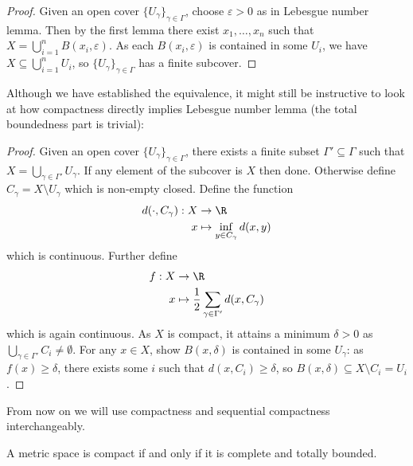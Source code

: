 \documentclass[a4paper]{article}
\begin{document}
\begin{proof}
  Given an open cover \(\{U_\gamma\}_{\gamma \in \Gamma}\), choose \(\varepsilon > 0\) as in Lebesgue number lemma. Then by the first lemma there exist \(x_1, \dots, x_n\) such that \(X = \bigcup_{i = 1}^n B(x_i, \varepsilon)\). As each \(B(x_i, \varepsilon)\) is contained in some \(U_i\), we have \(X \subseteq \bigcup_{i = 1}^n U_i\), so \(\{U_\gamma\}_{\gamma \in \Gamma}\) has a finite subcover.
\end{proof}

Although we have established the equivalence, it might still be instructive to look at how compactness directly implies Lebesgue number lemma (the total boundedness part is trivial):

\begin{proof}
  Given an open cover \(\{U_\gamma\}_{\gamma \in \Gamma}\), there exists a finite subset \(\Gamma' \subseteq \Gamma\) such that \(X = \bigcup_{\gamma \in \Gamma'} U_\gamma\). If any element of the subcover is \(X\) then done. Otherwise define \(C_\gamma = X \setminus U_\gamma\) which is non-empty closed. Define the function
  \begin{align*}
    d(\cdot, C_\gamma): X &\to \R \\
    x &\mapsto \inf_{y \in C_\gamma} d(x, y)
  \end{align*}
  which is continuous. Further define
  \begin{align*}
    f: X &\to \R \\
    x &\mapsto \frac{1}{2} \sum_{\gamma \in \Gamma'} d(x, C_\gamma)
  \end{align*}
  which is again continuous. As \(X\) is compact, it attains a minimum \(\delta > 0\) as \(\bigcup_{\gamma \in \Gamma'} C_i \neq \emptyset\). For any \(x \in X\), show \(B(x, \delta)\) is contained in some \(U_\gamma\): as \(f(x) \geq \delta\), there exists some \(i\) such that \(d(x, C_i) \geq \delta\), so \(B(x, \delta) \subseteq X \setminus C_i = U_i\).
\end{proof}

From now on we will use compactness and sequential compactness interchangeably.

\begin{proposition}
  A metric space is compact if and only if it is complete and totally bounded.
\end{proposition}
\end{document}
